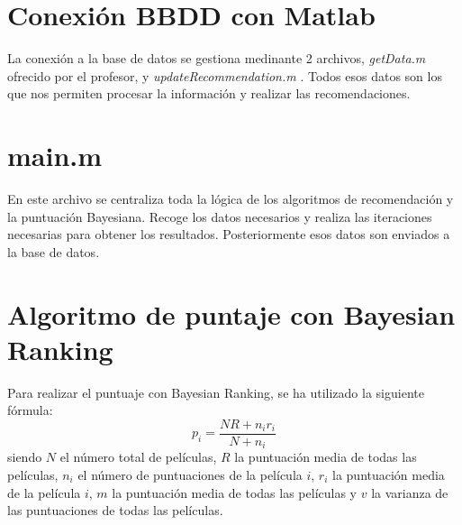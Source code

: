 \documentclass[a4paper, 12pt]{report}
\begin{document}
    \section{Conexión BBDD con Matlab}
    La conexión a la base de datos se gestiona medinante 2 archivos, \textit{getData.m} ofrecido por el profesor, y \textit{updateRecommendation.m} . Todos esos datos son los que nos permiten procesar la información y realizar las recomendaciones.
    \section{main.m}
    En este archivo se centraliza toda la lógica de los algoritmos de recomendación y la puntuación Bayesiana. Recoge los datos necesarios y realiza las iteraciones necesarias para obtener los resultados. Posteriormente esos datos son enviados a la base de datos.
    \section{Algoritmo de puntaje con Bayesian Ranking}
    Para realizar el puntuaje con Bayesian Ranking, se ha utilizado la siguiente fórmula:
    \begin{equation}
        p_i = \frac{NR+n_ir_i}{N+n_i}
    \end{equation}    siendo $N$ el número total de películas, $R$ la puntuación media de todas las películas, $n_i$ el número de puntuaciones de la película $i$, $r_i$ la puntuación media de la película $i$, $m$ la puntuación media de todas las películas y $v$ la varianza de las puntuaciones de todas las películas.
    \newpage


    \printbibliography
\end{document}
